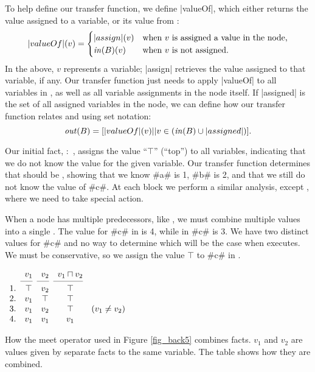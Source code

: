 \documentclass[12pt]{report}
\begin{document}
To help define our transfer function, we define |valueOf|,
which either returns the value assigned to a variable, or its value
from \inBa:
\begin{equation} |valueOf|(v) = 
  \begin{cases}
    |assign|(v) & \text{when $v$ is assigned a value in the node,} \\
    \text{\ensuremath{\mathit{in}(B)}}(v) & \text{when $v$ is not assigned.} 
  \end{cases}
\label{eqn_back2}
\end{equation}
In the above, $v$ represents a variable; |assign| retrieves the value
assigned to that variable, if any.  Our transfer function just needs
to apply |valueOf| to all variables in \inBa, as well as all
variable assignments in the node itself. If |assigned| is the set of
all assigned variables in the node, we can define how our transfer
function relates \inBa and \outBa using set notation:
\begin{equation}
  \text{\ensuremath{\mathit{out}(B)}} = [|valueOf|(v) || v \in (\text{\ensuremath{\mathit{in}(B)}} \cup |assigned|)].
\end{equation}

Our initial fact, :~, assigns the value ``$\top$'' (``top'') to all variables,
indicating that we do not know the value for the given variable. Our
transfer function determines that  should be
, showing that we know #a# is 1, #b# is 2, and
that we still do not know the value of #c#. At each block we perform a
similar analysis, except , where we need to
  take special action.

When a node has multiple predecessors, like ,
we must combine multiple \outBa values into a single \inBa. The value
for #c# in  is 4, while in 
#c# is 3. We have two distinct values for #c# and no way to determine
which will be the case when  executes. We
must be conservative, so we assign the value $\top$ to #c# in
.

\begin{table}[tbh]
  \centering
  \figbegin
  \begin{math}
    \begin{array}{ccccc}
      & v_1 & v_2 & v_1 \lub v_2 \\
      \cmidrule(r){2-2}\cmidrule(r){3-3}\cmidrule(r){4-4}
      1. & \top & v_2 & \top & \\ 
      2. & v_1 & \top & \top & \\
      3. & v_1 & v_2 & \top & \text{($v_1 \neq v_2$)}\\
      4. & v_1 & v_1 & v_1 
    \end{array}
  \end{math}
  \caption{How the meet operator used in
    Figure \ref{fig_back5} combines facts. $v_1$ and $v_2$ are
    values given by separate \outBa facts to the same variable. The
    table shows how they are combined.}
  \label{tbl_back2}
  \figend
\end{table}
\end{document}
